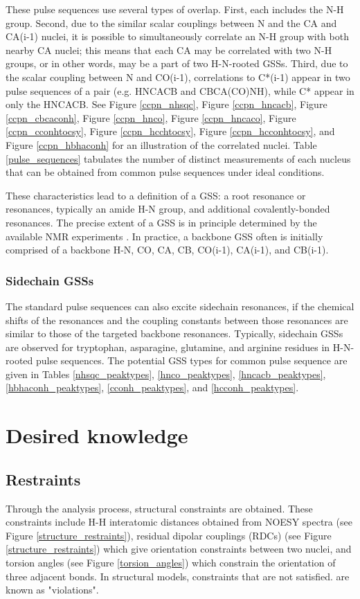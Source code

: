 These pulse sequences use several types of overlap.  First, each
includes the N-H group.  Second, due to the similar scalar couplings between
N and the CA and CA(i-1) nuclei, it is possible to simultaneously correlate an
N-H group with both nearby CA nuclei; this means that each CA may be correlated
with two N-H groups, or in other words, may be a part of two H-N-rooted GSSs. 
Third, due to the scalar coupling between N and CO(i-1), correlations to 
C*(i-1) appear in two pulse sequences of a pair (e.g. HNCACB and CBCA(CO)NH), 
while C* appear in only the HNCACB.  See Figure \ref{ccpn_nhsqc}, 
Figure \ref{ccpn_hncacb}, Figure \ref{ccpn_cbcaconh}, Figure \ref{ccpn_hnco}, 
Figure \ref{ccpn_hncaco}, Figure \ref{ccpn_cconhtocsy}, Figure \ref{ccpn_hcchtocsy},
Figure \ref{ccpn_hcconhtocsy}, and Figure \ref{ccpn_hbhaconh} for an 
illustration of the correlated nuclei.  Table \ref{pulse_sequences} tabulates
the number of distinct measurements of each nucleus that can be obtained from
common pulse sequences under ideal conditions.

These characteristics lead to a definition of a GSS: a root 
resonance or resonances, typically an amide H-N group, and additional 
covalently-bonded resonances.  The precise extent of a GSS is in principle 
determined by the available NMR experiments \cite{hncacb, hnco, cbcaconh}.  
In practice, a backbone GSS often is initially 
comprised of a backbone H-N, CO, CA, CB, CO(i-1), CA(i-1), and CB(i-1).

\subsubsection{Sidechain GSSs}
The standard pulse sequences can also excite sidechain resonances, if the 
chemical shifts of the resonances and the coupling constants between those
resonances are similar to those of the targeted backbone resonances.
Typically, sidechain GSSs are observed for tryptophan, asparagine, glutamine,
and arginine residues in H-N-rooted pulse sequences.
The potential GSS types for common pulse sequence are given in Tables 
\ref{nhsqc_peaktypes}, \ref{hnco_peaktypes}, 
\ref{hncacb_peaktypes}, \ref{hbhaconh_peaktypes}, \ref{cconh_peaktypes}, and
\ref{hcconh_peaktypes}.



\section{Desired knowledge}

\subsection*{Restraints}
Through the analysis process, structural constraints are obtained.  These 
constraints include H-H interatomic distances obtained from NOESY spectra
(see Figure \ref{structure_restraints}), residual dipolar couplings (RDCs) 
(see Figure \ref{structure_restraints}) which give orientation constraints
between two nuclei, and torsion angles (see Figure \ref{torsion_angles}) 
which constrain the orientation of three adjacent bonds. In structural 
models, constraints that are not satisfied. are known as "violations".

